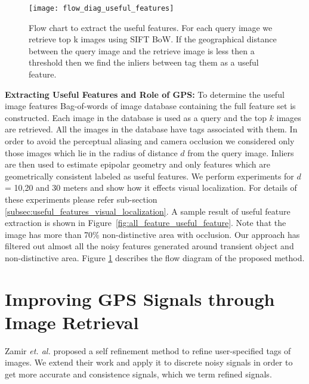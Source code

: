 \begin{figure}[h]
  \centering
  \texttt{[image: flow\_diag\_useful\_features]}
  \caption{ Flow chart to extract the useful features. For each query image we retrieve top k images using SIFT BoW. If the geographical distance between the query image and the retrieve image is less then a threshold then we find the inliers between tag them as a useful feature.}
  \label{fig:flow_diag_useful_features}
\end{figure}

\textbf{Extracting Useful Features and Role of GPS:}
To determine the useful image features Bag-of-words of image 
database containing the full feature set is constructed. 
Each image in the database is used as a query 
and the top $k$ images are retrieved. All the images in the database have 
\gps tags associated with them. In order to avoid the perceptual aliasing 
and camera occlusion we considered only those images which lie in the radius 
of distance $d$ from the query image. Inliers are then used to estimate epipolar 
geometry and only features which are geometrically consistent  labeled as useful features. 
We perform experiments for $d$ = 10,20 and 30 meters and show how it effects
visual localization. For details of these experiments please refer sub-section \ref{subsec:useful_features_visual_localization}.
A sample result of useful feature extraction is shown in
Figure~\ref{fig:all_feature_useful_feature}.
Note that the image has more than 70\% non-distinctive area with occlusion. 
Our approach has filtered out almost all the noisy features generated around transient 
object and non-distinctive area. Figure \ref{fig:flow_diag_useful_features} 
describes the flow diagram of the proposed method.

\section{Improving GPS Signals through Image Retrieval}
\label{sec:improve_gps_img_retr}
Zamir {\em et. al.} \cite{Zamir_2014_CVPR} proposed a self refinement 
method to refine user-specified \gps tags of images. We extend their
work and apply it to discrete noisy \gps signals in order to get more accurate 
and consistence \gps signals, which we term refined \gps signals.
